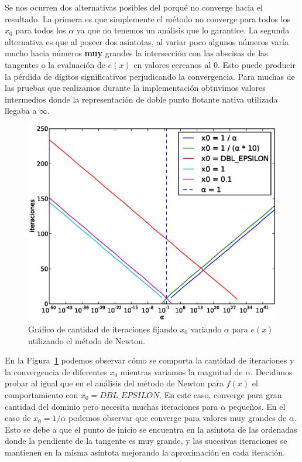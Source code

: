 Se nos ocurren dos alternativas posibles del porqué no converge hacia el
resultado. La primera es que simplemente el método no converge para todos los
$x_0$ para todos los $\alpha$ ya que no tenemos un análisis que lo garantice.
La segunda alternativa es que al poseer dos asíntotas, al variar poco algunos
números varía mucho hacia números \textbf{muy} grandes la intersección con las
abscisas de las tangentes o la evaluación de $e(x)$ en valores cercanos al $0$.
Esto puede producir la pérdida de dígitos significativos perjudicando la
convergencia. Para muchas de las pruebas que realizamos durante la
implementación obtuvimos valores intermedios donde la representación de doble
punto flotante nativa utilizada llegaba a $\infty$.

\begin{figure}[!htbp]
  \begin{center}
    \includegraphics[scale=0.5]{graficos/new/e_newton_x0_fijo.eps}
    \caption{\label{fig:e_newton_x0_fijo} Gráfico de cantidad de iteraciones fijando $x_0$ variando $\alpha$ para $e(x)$ utilizando el método de Newton.}
  \end{center}
\end{figure}

En la Figura~\ref{fig:e_newton_x0_fijo} podemos observar cómo se comporta la
cantidad de iteraciones y la convergencia de diferentes $x_0$ mientras variamos
la magnitud de $\alpha$. Decidimos probar al igual que en el análisis del
método de Newton para $f(x)$ el comportamiento con $x_0 =
\textit{DBL\_EPSILON}$. En este caso, converge para gran cantidad del dominio
pero necesita muchas iteraciones para $\alpha$ pequeños. En el caso de $x_0 =
1 / \alpha$ podemos observar que converge para valores muy grandes de $\alpha$.
Esto se debe a que el punto de inicio se encuentra en la asíntota de las
ordenadas donde la pendiente de la tangente es muy grande, y las sucesivas
iteraciones se mantienen en la misma asíntota mejorando la aproximación en cada
iteración.

